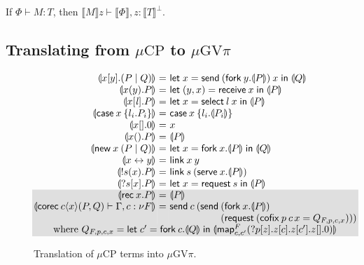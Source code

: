 \documentclass[orivec,envcountsame]{llncs}
\makeatletter
\newcommand{\cpdual}[1]{#1^\perp}
\newcommand{\cptyp}[2]{#1 \vdash #2}
\newcommand{\gvtyp}[3]{#1 \vdash #2 : #3}
\newcommand{\mapname}{\mathsf{map}}
\newcommand{\map}[3]{\mapname^{#1}_{#2}(#3)}
\newcommand{\mkwd}[1]{\mathsf{#1}}
\newcommand{\link}[2]{#1 \leftrightarrow #2}
\newcommand{\cut}[4]{\mkwd{new}\:#1 \: (#3 \mid #4)}
\newcommand{\replicate}[2]{{!#1(#2)}}
\newcommand{\derelict}[2]{{?#1[#2]}}
\newcommand{\rec}[1]{\mkwd{rec}\:#1}
\newcommand{\corec}[5]{\mkwd{corec}\:#1 \langle #2 \rangle (#4,#5)}
\newcommand{\clabel}[1]{\mathit{#1}}
\renewcommand{\case}[2]{\mkwd{case}\:#1\:\{#2\}}
\newcommand{\sel}[2]{#1[\clabel{#2}]}
\newcommand{\gvsend}[2]{\mkwd{send}\:#1\:#2}
\newcommand{\gvreceive}[1]{\mkwd{receive}\:#1}
\newcommand{\gvlet}[3]{\mkwd{let}\;#1 = #2\;\mkwd{in}\;#3}
\newcommand{\gvselect}[2]{\mkwd{select}\:#1\:#2}
\newcommand{\gvcase}[2]{\mkwd{case}\:#1\:\{#2\}}
\newcommand{\gvlink}[2]{\mkwd{link}\:#1\:#2}
\newcommand{\gvfork}[2]{\mkwd{fork}\:#1.#2}
\newcommand{\lrkwd}{\mkwd{cofix}}
\newcommand{\gvfix}[3]{\lrkwd\:#1\:#2 = #3}
\newcommand{\gvserve}[2]{\mkwd{serve}\:#1.#2}
\newcommand{\gvrequest}[1]{\mkwd{request}\:#1}
\newcommand{\key}{\mkwd}
\newcommand{\tocp}[1]{\llbracket #1 \rrbracket}
\newcommand{\togv}[1]{\llparenthesis #1 \rrparenthesis}
\newcommand{\mucp}{$\mu\mathrm{CP}$\xspace}
\newcommand{\gvpi}{$\mu\mathrm{GV}\pi$\xspace}
\newcommand{\ba}{\begin{array}}
\newcommand{\ea}{\end{array}}
\newcommand{\bl}{\ba[t]{@{}l@{}}}
\newcommand{\el}{\ea}
\newenvironment{equations}{\[\ba{@{}r@{~}c@{~}l@{}}}{\ea\]}
\newcommand\shaderow{\noalign{\vskip-0.4pt}\rowcolor{shade}[0.6mm]}
\makeatother
\begin{document}
\begin{theorem}
  If $\gvtyp{\Phi}{M}{T}$, then $\cptyp{\tocp{M}z}{\tocp{\Phi},z:\cpdual{\tocp{T}}}$.
\end{theorem}

\subsection{Translating from \mucp to \gvpi}\label{sec:cptogvpi}

\begin{figure}[float]\small
\begin{equations}
\small
  \togv{x[y].(P \mid Q)} &=&
    \gvlet{x}{\gvsend{(\gvfork{y}{\togv{P}})}{x}}{\togv{Q}} \\
  \togv{x(y).P} &=&
    \gvlet{(y,x)}{\gvreceive{x}}{\togv{P}} \\
  \togv{\sel{x}{\mathit{l}}.P} &=&
    \gvlet{x}{\gvselect{l}{x}}{\togv{P}} \\
  \togv{\case{x}{l_i.P_i}} &=&
    \gvcase{x}{l_i.\togv{P_i}} \\
  \togv{x[].0} &=& x \\
  \togv{x().P} &=& \togv{P} \\
  \togv{\cut{x}{}{P}{Q}} &=&
    \gvlet{x}{\gvfork{x}{\togv{P}}}{\togv{Q}} \\
  \togv{\link{x}{y}} &=& \gvlink{x}{y} \\
  \togv{\replicate{s}{x}.P} &=&
    \gvlink{s}{(\gvserve{x}{\togv{P}})} \\
  \togv{\derelict{s}{x}.P} &=&
    \gvlet{x}{\gvrequest{s}}{\togv{P}} \\ \shaderow
  \togv{\rec{x}.P} &=& \togv{P} \\ \shaderow
  \togv{\cptyp{\corec{c}{x}{}{P}{Q}}{\Gamma, c:\nu F}} &=&
    \key{send}\:c\:(
      \key{send}\:
         \bl
         (\gvfork{x}{\togv{P}}) \\
         (\gvrequest{(\gvfix{p}{c\,x}{Q_{F,p,c,x}})})) \\
         \el \\ \shaderow
\multicolumn{3}{@{}l@{}}
{\qquad\text{where }
  Q_{F,p,c,x} =
    \gvlet{c'}{\gvfork{c}{\togv{Q}}}
          {\togv{\map{F}{c,c'}{\derelict{p}{z}.z[c].z[c'].z[].0}}}}
\end{equations}%
\caption{Translation of \mucp terms into \gvpi.}\label{fig:fromcp}
\end{figure}
\end{document}
